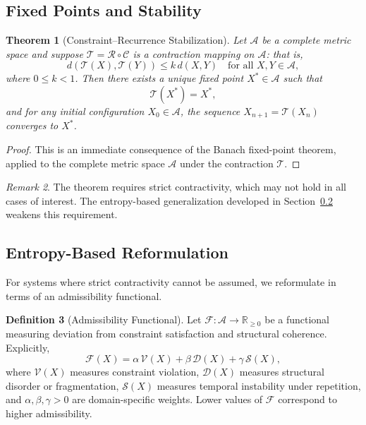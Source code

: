 \documentclass[12pt, oneside]{article}
\newtheorem{theorem}{Theorem}[section]
\theoremstyle{definition}
\newtheorem{definition}[theorem]{Definition}
\theoremstyle{remark}
\newtheorem{remark}[theorem]{Remark}
\begin{document}
\subsection{Fixed Points and Stability}

\begin{theorem}[Constraint--Recurrence Stabilization]
\label{thm:main}
Let $\mathcal{A}$ be a complete metric space and suppose $\mathcal{T} = \mathcal{R} \circ \mathcal{C}$ is a contraction mapping on $\mathcal{A}$: that is,
\[
d(\mathcal{T}(X), \mathcal{T}(Y)) \leq k\, d(X, Y) \quad \text{for all } X, Y \in \mathcal{A},
\]
where $0 \leq k < 1$.
Then there exists a unique fixed point $X^{*} \in \mathcal{A}$ such that
\[
\mathcal{T}(X^{*}) = X^{*},
\]
and for any initial configuration $X_{0} \in \mathcal{A}$, the sequence $X_{n+1} = \mathcal{T}(X_{n})$ converges to $X^{*}$.
\end{theorem}

\begin{proof}
This is an immediate consequence of the Banach fixed-point theorem, applied to the complete metric space $\mathcal{A}$ under the contraction $\mathcal{T}$.
\end{proof}

\begin{remark}
The theorem requires strict contractivity, which may not hold in all cases of interest.
The entropy-based generalization developed in Section~\ref{subsec:entropy} weakens this requirement.
\end{remark}

\subsection{Entropy-Based Reformulation}
\label{subsec:entropy}

For systems where strict contractivity cannot be assumed, we reformulate in terms of an admissibility functional.

\begin{definition}[Admissibility Functional]
Let $\mathcal{F}: \mathcal{A} \to \mathbb{R}_{\geq 0}$ be a functional measuring deviation from constraint satisfaction and structural coherence.
Explicitly,
\[
\mathcal{F}(X) = \alpha \,\mathcal{V}(X) + \beta \,\mathcal{D}(X) + \gamma \,\mathcal{S}(X),
\]
where $\mathcal{V}(X)$ measures constraint violation, $\mathcal{D}(X)$ measures structural disorder or fragmentation, $\mathcal{S}(X)$ measures temporal instability under repetition, and $\alpha, \beta, \gamma > 0$ are domain-specific weights.
Lower values of $\mathcal{F}$ correspond to higher admissibility.
\end{definition}
\end{document}

